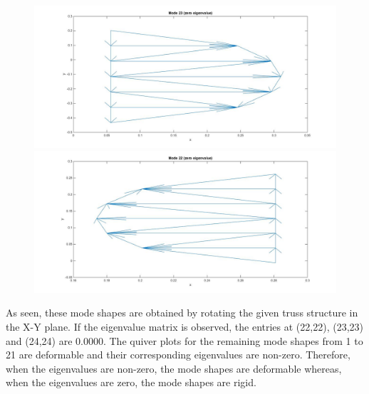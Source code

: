 \documentclass[12pt]{article}
\begin{document}
\begin{figure}[ht]
  \begin{minipage}[b]{0.4\textwidth}
    \includegraphics[scale=0.2]{mode23.jpg}
  \end{minipage}
  \hfill
  \begin{minipage}[b]{0.5\textwidth}
    \includegraphics[scale=0.2]{mode22.jpg}
  \end{minipage}
\end{figure}
As seen, these mode shapes are obtained by rotating the given truss structure in the X-Y plane. If the eigenvalue matrix is observed, the entries at (22,22), (23,23) and (24,24) are 0.0000. The quiver plots for the remaining mode shapes from 1 to 21 are deformable and their corresponding eigenvalues are non-zero. Therefore, when the eigenvalues are non-zero, the mode shapes are deformable whereas, when the eigenvalues are zero, the mode shapes are rigid.
\end{document}
